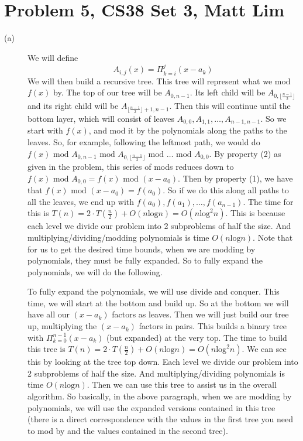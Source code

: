 \documentclass{article}
\begin{document}
\section*{Problem 5, CS38 Set 3, Matt Lim}
\begin{description}
    \item[(a)]We will define
        \[ A_{i,j}(x) = \Pi_{k=i}^{j} (x - a_k) \]
        We will then build a recursive tree. This tree will represent what we mod $f(x)$
        by. The top of our tree will be $A_{0, n-1}$. Its left child will be
        $A_{0, \lfloor \frac{n-1}{2} \rfloor}$ and its right child will be
        $A_{\lfloor \frac{n-1}{2} \rfloor + 1, n-1}$. Then this will continue until
        the bottom layer, which will consist of leaves $A_{0,0}, A_{1,1}, \dots, A_{n-1,
        n-1}$. So we start with $f(x)$, and mod it by the polynomials along the paths to
        the leaves. So, for example, following the leftmost path, we would do
        $f(x) \text{ mod } A_{0, n-1} \text{ mod } A_{0, \lfloor \frac{n-1}{2} \rfloor}
        \text{ mod } \dots \text{ mod } A_{0, 0}$. By property (2) as given in the
        problem, this series of mods reduces down to $f(x) \text{ mod } A_{0,0} =
        f(x) \text{ mod } (x - a_0)$. Then by property (1), we have that
        $f(x) \text{ mod } (x - a_0) = f(a_0)$. So if we do this along all paths to all
        the leaves, we end up with $f(a_0), f(a_1), \dots, f(a_{n-1})$. The time
        for this is $T(n) = 2 \cdot T(\frac{n}{2}) + O(n\text{log}n) =
        O(n\text{log}^2n)$. This is because each level we divide our problem into 2
        subproblems of half the size. And multiplying/dividing/modding polynomials is
        time $O(n\text{log}n)$.  Note that for us
        to get the desired time bounds, when we are modding by polynomials, they must be
        fully expanded. So to fully expand the polynomials, we will do the following.

        To fully expand the polynomials, we will use divide and conquer. This time, we
        will start at the bottom and build up. So at the bottom we will have all our
        $(x-a_k)$ factors as leaves. Then we will just build our tree up, multiplying
        the $(x-a_k)$ factors in pairs. This builds a binary tree with
        $\Pi_{k=0}^{n-1} (x - a_k)$ (but expanded) at the very top. The time to build this tree
        is $T(n) = 2 \cdot T(\frac{n}{2}) + O(n\text{log}n) = O(n\text{log}^2n)$. We can
        see this by looking at the tree top down. Each level we divide our problem into
        2 subproblems of half the size. And multiplying/dividing polynomials is time
        $O(n\text{log}n)$. Then we can use this tree to assist us in the overall
        algorithm. So basically, in the above paragraph, when we are modding by
        polynomials, we will use the expanded versions contained in this tree (there is
        a direct correspondence with the values in the first tree you need to mod by and
        the values contained in the second tree).


\end{description}
\end{document}
